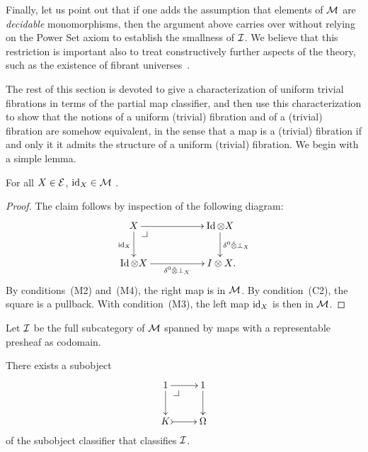 \documentclass[reqno,10pt,a4paper,oneside,draft]{amsart}
\begin{document}
{{\begin{remark}
Finally, let us point out that if one adds the assumption that elements of $\cal{M}$ are \emph{decidable} monomorphisms, then the argument above carries over without relying on the Power Set axiom to establish the smallness of $\cal{I}$. We believe that this restriction is important also to treat constructively further aspects of the theory, such as the existence
of fibrant universes~\cite{cohen-et-al:cubicaltt}.
\end{remark}  



The rest of this section is devoted to give a characterization of uniform trivial fibrations in terms of the partial map classifier, and then use this characterization to show that the notions of a uniform (trivial) fibration and of a (trivial) fibration are somehow equivalent, in the sense that a map is a (trivial) fibration if and only it it admits the structure of a uniform (trivial) fibration.  
We begin with a simple lemma.




\begin{lemma} \label{identities-in-M}
For all $X \in \cal{E}$,  $\id_X \in \cal{M}$ .
\end{lemma}

\begin{proof}  The claim follows by inspection of the following diagram:
\[
\xymatrix@C+3em{
  X
  \ar[r]
  \ar[d]_{\id_X}
  \pullback{dr}
&
  \Id \otimes X
  \ar[d]^{\delta^0 \hatotimes \bot_X}
\\
  \Id \otimes X
  \ar[r]_{\delta^0 \hatotimes \bot_X}
&
  I \otimes X
\rlap{.}}
\]
By conditions~(M2) and~(M4), the right map is in $\cal{M}$.
By condition~(C2), the square is a pullback.
With condition~(M3), the left map $\id_X$ is then in $\cal{M}$.
\end{proof}

 Let $\cal{I}$ be the full subcategory of $\cal{M}$ spanned by maps with a representable presheaf as codomain. 



\begin{lemma} \label{partial-map-classifier}
There exists a subobject
\begin{equation} \label{partial-map-classifier:0}
\begin{gathered}
\xymatrix{
  1
  \ar[r]
  \ar[d]
  \pullback{dr}
&
  1
  \ar[d]
\\
  K
  \ar@{>->}[r]
&
  \Omega
}
\end{gathered}
\end{equation}
of the subobject classifier that classifies $\cal{I}$.
\end{lemma} 

}}
\end{document}
